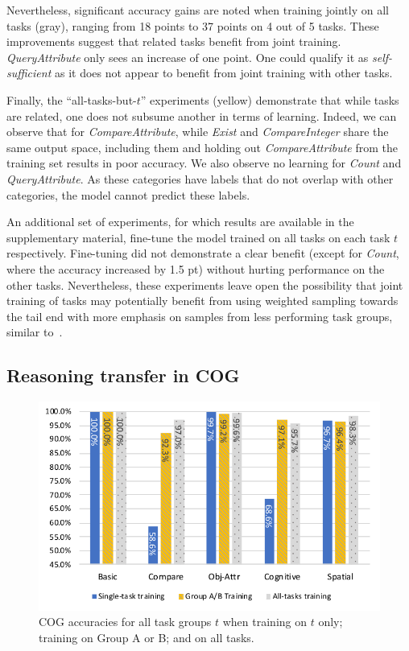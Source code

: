 Nevertheless, significant accuracy gains are noted when training jointly on all tasks (gray), ranging from 18 points to 37 points on 4 out of 5 tasks. These improvements suggest that related tasks benefit from joint training. \textit{QueryAttribute} only sees an increase of one point. One could qualify it as \textit{self-sufficient} as it does not appear to benefit from joint training with other tasks.

Finally, the ``all-tasks-but-$t$'' experiments (yellow) demonstrate that while tasks are related, one does not subsume another in terms of learning. Indeed, we can observe that for \textit{CompareAttribute}, while \textit{Exist} and \textit{CompareInteger} share the same output space, including them and holding out \textit{CompareAttribute} from the training set results in poor accuracy.
We also observe no learning for \textit{Count} and \textit{QueryAttribute}. As these categories have labels that do not overlap with other categories, the model cannot predict these labels.

An additional set of experiments, for which results are available in the supplementary material, fine-tune the model trained on all tasks on each task $t$ respectively.
Fine-tuning did not demonstrate a clear benefit (except for \textit{Count}, where the accuracy increased by 1.5 pt) without hurting performance on the other tasks. Nevertheless, these experiments leave open the possibility that joint training of tasks may potentially benefit from using weighted sampling towards the tail end with more emphasis on samples from less performing task groups, similar to~\cite{guo2018dynamic, kendall2018multi}.

\subsection{Reasoning transfer in COG}
\label{sec:reasoning-cog}

\begin{figure}[htbp]
	\centering
	\includegraphics[width=\columnwidth]{../results/COG_reasoning_transfer_new.pdf}
	\caption{COG accuracies for all task groups $t$ when training on $t$ only; training on Group A or B; and on all tasks.}
	\label{fig:COG-reasoning-results}
\end{figure}\vspace{2pt}

